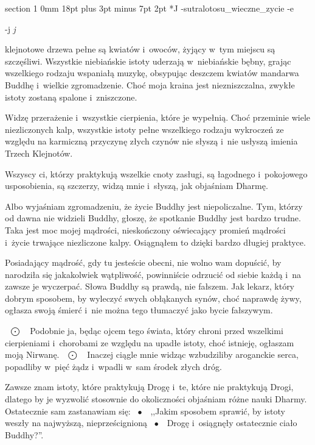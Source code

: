 \documentclass[12pt]{article}
\makeatletter
\renewcommand{\section}{\@startsection%
 {section}			%
 {1}				%
 {0mm}				%
 {18pt plus 3pt minus 7pt}	%
 { 2pt}				%
 {\bfseries}}			%
\newcommand{\keisu}		{\mbox{\ $\bigodot$\ \ }}
\newcommand{\shokei}		{\mbox{\ $\bullet$\ \ }}
\newcounter{labelnum}
\newenvironment{Prayer}[4]{%
	\section*{#2}
	\ifx -#1
		\stepcounter{labelnum}\label{label.\arabic{labelnum}}\nopagebreak
	\else
		\label{#1}\nopagebreak
	\fi
	\ifx -#3
		\addcontentsline{toc}{section}{#2}
	\else
		\addcontentsline{toc}{section}{#3}
	\fi
	\ifx -#4
		{}
	\else
		\noindent\emph{#4}\par\nopagebreak
	\fi
	\begingroup
}
{\par\endgroup}
\makeatother
\begin{document}
\begin{Prayer}{sutralotosu_wieczne_zycie}
Jej klejnotowe drzewa pełne są kwiatów i~owoców, żyjący w~tym miejscu są
szczęśliwi. Wszystkie niebiańskie istoty uderzają w~niebiańskie bębny,
grając wszelkiego rodzaju wspaniałą muzykę, obsypując deszczem kwiatów
mandarwa Buddhę i~wielkie zgromadzenie. Choć moja kraina jest niezniszczalna,
zwykłe istoty zostaną spalone i~zniszczone.


Widzę przerażenie i~wszystkie cierpienia, które je wypełnią. Choć przeminie
wiele niezliczonych kalp, wszystkie istoty pełne wszelkiego rodzaju
wykroczeń ze względu na karmiczną przyczynę złych czynów nie słyszą i~nie
usłyszą imienia Trzech Klejnotów.


Wszyscy ci, którzy praktykują wszelkie cnoty zasługi, są łagodnego
i~pokojowego usposobienia, są szczerzy, widzą mnie i~słyszą, jak objaśniam
Dharmę.


Albo wyjaśniam zgromadzeniu, że życie Buddhy jest niepoliczalne. Tym, którzy
od dawna nie widzieli Buddhy, głoszę, że spotkanie Buddhy jest bardzo trudne.
Taka jest moc mojej mądrości, nieskończony oświecający promień mądrości
i~życie trwające niezliczone kalpy. Osiągnąłem to dzięki bardzo długiej
praktyce.


Posiadający mądrość, gdy tu jesteście obecni, nie wolno wam dopuścić, by
narodziła się jakakolwiek wątpliwość, powinniście odrzucić od siebie każdą
i~na zawsze je wyczerpać. Słowa Buddhy są prawdą, nie fałszem. Jak lekarz,
który dobrym sposobem, by wyleczyć swych obłąkanych synów, choć naprawdę
żywy, ogłasza swoją śmierć i~nie można tego tłumaczyć jako bycie fałszywym.


\keisu Podobnie ja, będąc ojcem tego świata, który chroni przed wszelkimi
cierpieniami i~chorobami ze względu na upadłe istoty, choć istnieję,
ogłaszam moją Nirwanę. \keisu Inaczej ciągle mnie widząc wzbudziliby aroganckie
serca, popadliby w~pięć żądz i~wpadli w~sam środek złych dróg.


Zawsze znam istoty, które praktykują Drogę i~te, które nie praktykują Drogi,
dlatego by je wyzwolić stosownie do okoliczności objaśniam różne nauki
Dharmy. Ostatecznie sam zastanawiam się: \shokei ,,Jakim sposobem sprawić,
by istoty weszły na najwyższą, nieprześcignioną \shokei Drogę i~osiągnęły
ostatecznie ciało Buddhy?''.
\end{Prayer}
\end{document}
